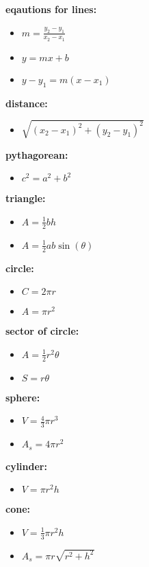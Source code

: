 \documentclass{article}
\begin{document}
\textbf{eqautions for lines:}
	\begin{itemize}
		\item $m = \frac{y_2 - y_1}{x_2 - x_1}$
		\item $y = mx + b$
		\item $y - y_1 = m(x - x_1)$
	\end{itemize}

\textbf{distance:}	
	\begin{itemize}
		\item $\sqrt{(x_2 - x_1)^2 + (y_2 - y_1)^2}$
	\end{itemize}	

\textbf{pythagorean:}
	\begin{itemize}
		\item $c^2 = a^2 + b^2$
	\end{itemize}

\textbf{triangle:}
	\begin{itemize}
		\item $A = \frac{1}{2}bh$
		\item $A = \frac{1}{2}ab\sin(\theta)$
	\end{itemize}

\textbf{circle:}	
	\begin{itemize}	
		\item $C = 2\pi r$
		\item $A = \pi r^2$ 
	\end{itemize}

\textbf{sector of circle:}
	\begin{itemize}
		\item $A = \frac{1}{2}r^2\theta$
		\item $S = r\theta$
	\end{itemize}

\textbf{sphere:}
	\begin{itemize}
		\item $V = \frac{4}{3}\pi r^3$
		\item $A_s = 4\pi r^2$
	\end{itemize}

\textbf{cylinder:}
	\begin{itemize}
		\item $V = \pi r^2h$
	\end{itemize}

\textbf{cone:}
	\begin{itemize}
		\item $V = \frac{1}{3}\pi r^2h$
		\item $A_s = \pi r\sqrt{r^2+h^2}$
	\end{itemize}
\end{document}
